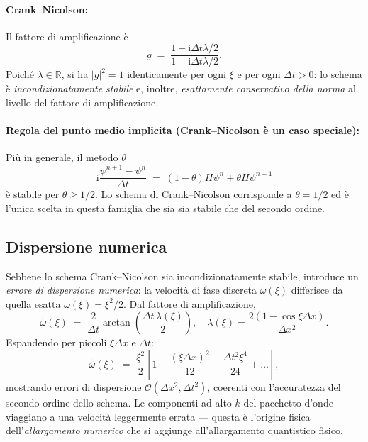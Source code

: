 \documentclass[12pt, a4paper]{article}
\newcommand{\dt}{\Delta t}
\newcommand{\dx}{\Delta x}
\newcommand{\ii}{\mathrm{i}}          %
\newcommand{\CN}{Crank--Nicolson}
\begin{document}
\paragraph{Crank--Nicolson:}
Il fattore di amplificazione è
\begin{equation}
  g \;=\; \frac{1 - \ii\dt\lambda/2}{1 + \ii\dt\lambda/2}.
\end{equation}
Poiché $\lambda \in \mathbb{R}$, si ha $|g|^2 = 1$ identicamente per
ogni $\xi$ e per ogni $\dt > 0$: lo schema è \emph{incondizionatamente
stabile} e, inoltre, \emph{esattamente conservativo della norma} al
livello del fattore di amplificazione.

\paragraph{Regola del punto medio implicita (Crank--Nicolson è un caso speciale):}
Più in generale, il metodo $\theta$
\begin{equation}
  \ii\frac{\psi^{n+1}-\psi^n}{\dt} \;=\;
  (1-\theta)H\psi^n + \theta H\psi^{n+1}
\end{equation}
è stabile per $\theta \geq 1/2$. Lo schema di Crank--Nicolson
corrisponde a $\theta = 1/2$ ed è l'unica scelta in questa famiglia
che sia sia stabile che del secondo ordine.

\subsection{Dispersione numerica}

Sebbene lo schema \CN{} sia incondizionatamente stabile, introduce
un \emph{errore di dispersione numerica}: la velocità di fase discreta
$\tilde{\omega}(\xi)$ differisce da quella esatta $\omega(\xi) = \xi^2/2$.
Dal fattore di amplificazione,
\begin{equation}
  \tilde{\omega}(\xi) \;=\;
  \frac{2}{\dt}\arctan\!\left(\frac{\dt\,\lambda(\xi)}{2}\right),
  \quad
  \lambda(\xi) = \frac{2(1-\cos\xi\dx)}{\dx^2}.
\end{equation}
Espandendo per piccoli $\xi\dx$ e $\dt$:
\begin{equation}
  \tilde{\omega}(\xi) \;=\; \frac{\xi^2}{2}
  \left[1 - \frac{(\xi\dx)^2}{12} - \frac{\dt^2\xi^4}{24} + \ldots\right],
\end{equation}
mostrando errori di dispersione $\mathcal{O}(\dx^2, \dt^2)$, coerenti con
l'accuratezza del secondo ordine dello schema. Le componenti ad alto $k$
del pacchetto d'onde viaggiano a una velocità leggermente errata — questa
è l'origine fisica dell'\emph{allargamento numerico} che si aggiunge
all'allargamento quantistico fisico.
\end{document}
